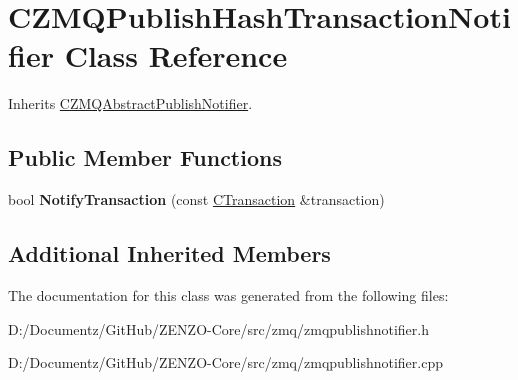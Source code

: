 \hypertarget{class_c_z_m_q_publish_hash_transaction_notifier}{}\section{C\+Z\+M\+Q\+Publish\+Hash\+Transaction\+Notifier Class Reference}
\label{class_c_z_m_q_publish_hash_transaction_notifier}


Inherits \mbox{\hyperlink{class_c_z_m_q_abstract_publish_notifier}{C\+Z\+M\+Q\+Abstract\+Publish\+Notifier}}.

\subsection*{Public Member Functions}
\begin{DoxyCompactItemize}
\item 
\mbox{\label{class_c_z_m_q_publish_hash_transaction_notifier_a6c9eb947bfb2fd855f611b6519e76d14}} 
bool {\bfseries Notify\+Transaction} (const \mbox{\hyperlink{class_c_transaction}{C\+Transaction}} \&transaction)
\end{DoxyCompactItemize}
\subsection*{Additional Inherited Members}


The documentation for this class was generated from the following files\+:\begin{DoxyCompactItemize}
\item 
D\+:/\+Documentz/\+Git\+Hub/\+Z\+E\+N\+Z\+O-\/\+Core/src/zmq/zmqpublishnotifier.\+h\item 
D\+:/\+Documentz/\+Git\+Hub/\+Z\+E\+N\+Z\+O-\/\+Core/src/zmq/zmqpublishnotifier.\+cpp\end{DoxyCompactItemize}
